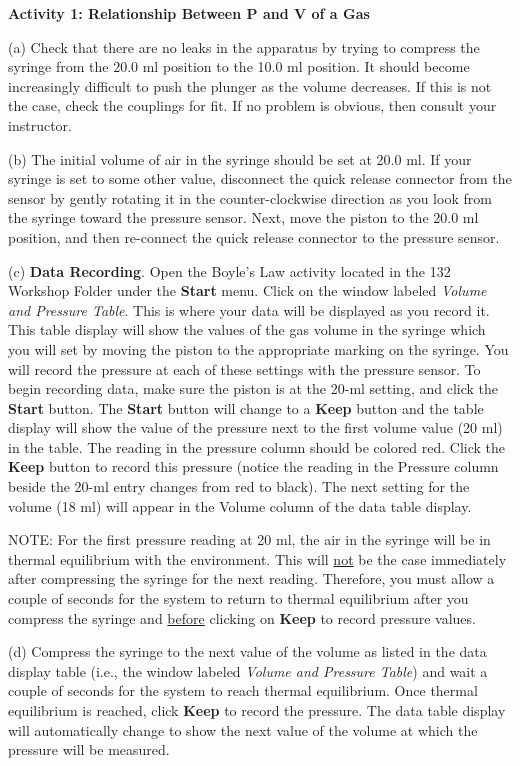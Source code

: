\textbf{Activity 1: Relationship Between P and V of a Gas}

(a) Check that there are no leaks in the apparatus by trying to compress
the syringe from the 20.0 ml position to the 10.0 ml position. It should become
increasingly difficult to push the plunger as the volume decreases. If this
is not the case, check the couplings for fit. If no problem is obvious, then
consult your instructor. 
\vspace{20mm}

(b) The initial volume of air in the syringe should be set at 20.0 ml. If your
syringe is set to some other value, disconnect the quick release connector from
the sensor by gently rotating it in the counter-clockwise direction as you look
from the syringe toward the pressure sensor. Next, move the piston to the 20.0
ml position, and then re-connect the quick release connector to the pressure
sensor. 

(c) \textbf{Data Recording}. Open the Boyle's Law activity located in the 132
Workshop Folder under the {\bf Start} menu. Click on the window labeled \textit{Volume
and Pressure Table}. This is where your data will be displayed as you record
it. This table display will show the values of the gas volume in the syringe
which you will set by moving the piston to the appropriate marking on the syringe.
You will record the pressure at each of these settings with the pressure sensor.
To begin recording data, make sure the piston is at the 20-ml setting, and click
the {\bf Start} button. The {\bf Start} button will change to a {\bf Keep} button and the table
display will show the value of the pressure next to the first volume value (20
ml) in the table. The reading in the pressure column should be colored red.
Click the {\bf Keep} button to record this pressure (notice the reading in the Pressure
column beside the 20-ml entry changes from red to black). The next setting for
the volume (18 ml) will appear in the Volume column of the data table display.

NOTE: For the first pressure reading at 20 ml, the air in the syringe will be
in thermal equilibrium with the environment. This will \underline{not} be the case immediately
after compressing the syringe for the next reading. Therefore, you must allow
a couple of seconds for the system to return to thermal equilibrium after you 
compress the syringe and \underline{before} clicking on {\bf Keep} to record pressure values. 

(d) Compress the syringe to the next value of the volume as listed in the data
display table (i.e., the window labeled \textit{Volume and Pressure Table})
and wait a couple of seconds for the system to reach thermal equilibrium. Once 
thermal equilibrium is reached, click {\bf Keep} to record the pressure. The data 
table display will automatically change to show the next value of the volume 
at which the pressure will be measured. 

